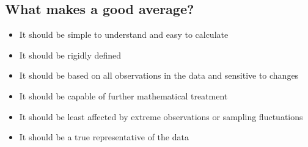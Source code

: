 \documentclass[
10pt, %
a4paper, %
]{report}
\begin{document}
\subsection*{What makes a good average?}

\begin{itemize}
\item It should be simple to understand and easy to calculate
\item It should be rigidly defined
\item It should be based on all observations in the data and sensitive to changes
\item It should be capable of further mathematical treatment
\item It should be least affected by extreme observations or sampling fluctuations
\item It should be a true representative of the data
\end{itemize}
\end{document}
